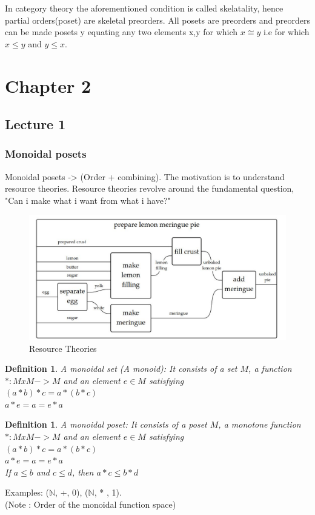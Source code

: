 \documentclass{article}
\newtheorem{defn}[thm]{Definition} %
\begin{document}
In category theory the aforementioned condition is called skelatality, hence partial orders(poset) are skeletal preorders. All posets are preorders and preorders can be made posets y equating any two elements x,y for which $ x \cong y$ i.e for which $x \leq y $ and  $y \leq x$.





\newpage
\section{Chapter 2}
\subsection{Lecture 1}
\subsubsection{Monoidal posets} 
Monoidal posets -> (Order + combining).
The motivation is to understand resource theories. Resource theories revolve around the fundamental question, "Can i make what i want from what i have?"

\begin{figure}[h!]
    \centering
    \includegraphics[scale=0.5]{./images/5.jpg} 
    \caption{Resource Theories}
    \label{fig:my_label}
\end{figure}

\begin{defn}
    A monoidal set (A monoid): It consists of a set $M$, a  function $ * : MxM -> M $ and an element $e \in M$
    satisfying \\
    $ (a *b ) * c = a* (b*c) $\\
    $ a * e = a = e * a$
\end{defn}

\begin{defn}
    A monoidal poset: It consists of a poset $M$, a monotone function $ * : MxM -> M $ and an element $e \in M$
    satisfying \\
    $ (a *b ) * c = a* (b*c) $\\
    $ a * e = a = e * a$ \\
    If $a \leq b$ and $c \leq d$, then $a*c \leq b*d$
\end{defn}
Examples: ($\mathbb{N}$, +, 0), ($\mathbb{N}$, * , 1). \\
(Note : Order of the monoidal function space) \\
\end{document}
